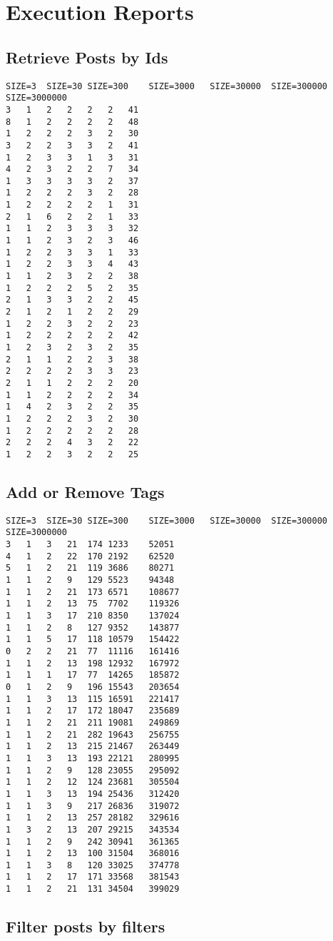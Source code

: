 
\chapter{Execution Reports}
\label{executionReports}


\section{Retrieve Posts by Ids}
\label{data:retrievePostByIds01}

\begin{lstlisting}
SIZE=3	SIZE=30	SIZE=300	SIZE=3000	SIZE=30000	SIZE=300000	SIZE=3000000
3	1	2	2	2	2	41
8	1	2	2	2	2	48
1	2	2	2	3	2	30
3	2	2	3	3	2	41
1	2	3	3	1	3	31
4	2	3	2	2	7	34
1	3	3	3	3	2	37
1	2	2	2	3	2	28
1	2	2	2	2	1	31
2	1	6	2	2	1	33
1	1	2	3	3	3	32
1	1	2	3	2	3	46
1	2	2	3	3	1	33
1	2	2	3	3	4	43
1	1	2	3	2	2	38
1	2	2	2	5	2	35
2	1	3	3	2	2	45
2	1	2	1	2	2	29
1	2	2	3	2	2	23
1	2	2	2	2	2	42
1	2	3	2	3	2	35
2	1	1	2	2	3	38
2	2	2	2	3	3	23
2	1	1	2	2	2	20
1	1	2	2	2	2	34
1	4	2	3	2	2	35
1	2	2	2	3	2	30
1	2	2	2	2	2	28
2	2	2	4	3	2	22
1	2	2	3	2	2	25
\end{lstlisting}

\section{Add or Remove Tags}
\label{data:addOrRemoveTags01}

\begin{lstlisting}
SIZE=3	SIZE=30	SIZE=300	SIZE=3000	SIZE=30000	SIZE=300000	SIZE=3000000
3	1	3	21	174	1233	52051
4	1	2	22	170	2192	62520
5	1	2	21	119	3686	80271
1	1	2	9	129	5523	94348
1	1	2	21	173	6571	108677
1	1	2	13	75	7702	119326
1	1	3	17	210	8350	137024
1	1	2	8	127	9352	143877
1	1	5	17	118	10579	154422
0	2	2	21	77	11116	161416
1	1	2	13	198	12932	167972
1	1	1	17	77	14265	185872
0	1	2	9	196	15543	203654
1	1	3	13	115	16591	221417
1	1	2	17	172	18047	235689
1	1	2	21	211	19081	249869
1	1	2	21	282	19643	256755
1	1	2	13	215	21467	263449
1	1	3	13	193	22121	280995
1	1	2	9	128	23055	295092
1	1	2	12	124	23681	305504
1	1	3	13	194	25436	312420
1	1	3	9	217	26836	319072
1	1	2	13	257	28182	329616
1	3	2	13	207	29215	343534
1	1	2	9	242	30941	361365
1	1	2	13	100	31504	368016
1	1	3	8	120	33025	374778
1	1	2	17	171	33568	381543
1	1	2	21	131	34504	399029
\end{lstlisting}

\section{Filter posts by filters}
\label{data:filterPostsByFilters}

